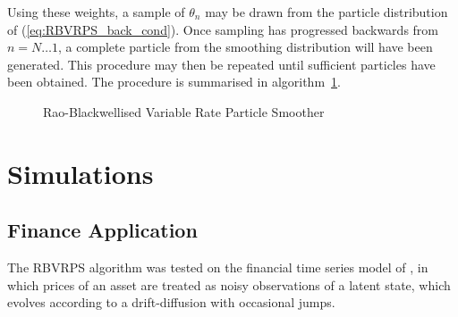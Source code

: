 \documentclass[journal]{IEEEtran}
\begin{document}
Using these weights, a sample of $\theta_{n}$ may be drawn from the particle distribution of (\ref{eq:RBVRPS_back_cond}). Once sampling has progressed backwards from $n=N \dots 1$, a complete particle from the smoothing distribution will have been generated. This procedure may then be repeated until sufficient particles have been obtained. The procedure is summarised in algorithm~\ref{alg:RBVRPS}.

\begin{figure}
\caption{Rao-Blackwellised Variable Rate Particle Smoother}
\label{alg:RBVRPS}
\end{figure}



\section{Simulations} \label{sec:simulations}

\subsection{Finance Application} \label{sec:finance}

The RBVRPS algorithm was tested on the financial time series model of \cite{Godsill2007a,Christensen2012}, in which prices of an asset are treated as noisy observations of a latent state, which evolves according to a drift-diffusion with occasional jumps.
\end{document}
